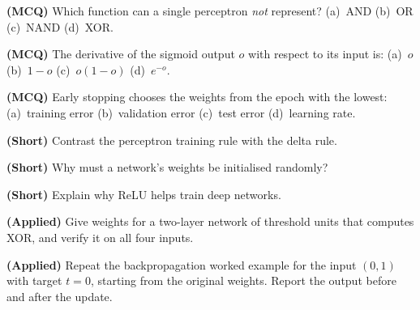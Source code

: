 \begin{reviewq}
  \item \textbf{(MCQ)} Which function can a single perceptron \emph{not} represent?
        (a)~AND (b)~OR (c)~NAND (d)~XOR.
  \item \textbf{(MCQ)} The derivative of the sigmoid output $o$ with respect to its
        input is: (a)~$o$ (b)~$1 - o$ (c)~$o(1 - o)$ (d)~$e^{-o}$.
  \item \textbf{(MCQ)} Early stopping chooses the weights from the epoch with the
        lowest: (a)~training error (b)~validation error (c)~test error (d)~learning
        rate.
  \item \textbf{(Short)} Contrast the perceptron training rule with the delta rule.
  \item \textbf{(Short)} Why must a network's weights be initialised randomly?
  \item \textbf{(Short)} Explain why ReLU helps train deep networks.
  \item \textbf{(Applied)} Give weights for a two-layer network of threshold units
        that computes XOR, and verify it on all four inputs.
  \item \textbf{(Applied)} Repeat the backpropagation worked example for the input
        $(0, 1)$ with target $t = 0$, starting from the original weights. Report the
        output before and after the update.
\end{reviewq}
